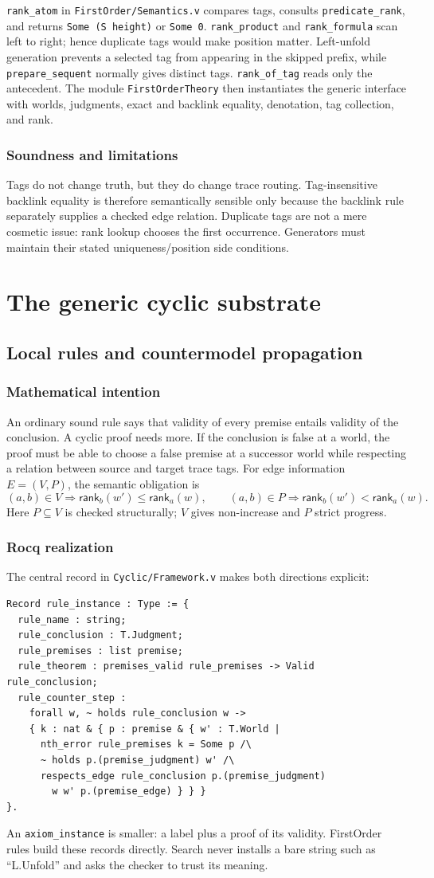 \documentclass[11pt,oneside]{book}
\DeclareRobustCommand{\code}[1]{\nolinkurl{#1}}
\DeclareRobustCommand{\file}[1]{\nolinkurl{#1}}
\newcommand{\src}[2]{\code{#2} in \file{#1}}
\newcommand{\rank}{\mathsf{rank}}
\newcommand{\mathintent}{\subsection*{Mathematical intention}}
\newcommand{\rocqreal}{\subsection*{Rocq realization}}
\newcommand{\soundlim}{\subsection*{Soundness and limitations}}
\begin{document}
\src{FirstOrder/Semantics.v}{rank_atom} compares tags, consults
\code{predicate_rank}, and returns \code{Some (S height)} or \code{Some 0}.
\code{rank_product} and \code{rank_formula} scan left to right; hence duplicate
tags would make position matter.  Left-unfold generation prevents a selected
tag from appearing in the skipped prefix, while \code{prepare_sequent} normally
gives distinct tags.  \code{rank_of_tag} reads only the antecedent.  The module
\code{FirstOrderTheory} then instantiates the generic interface with worlds,
judgments, exact and backlink equality, denotation, tag collection, and rank.

\soundlim

Tags do not change truth, but they do change trace routing.  Tag-insensitive
backlink equality is therefore semantically sensible only because the backlink
rule separately supplies a checked edge relation.  Duplicate tags are not a
mere cosmetic issue: rank lookup chooses the first occurrence.  Generators
must maintain their stated uniqueness/position side conditions.

\chapter{The generic cyclic substrate}
\label{ch:cyclic}

\section{Local rules and countermodel propagation}

\mathintent

An ordinary sound rule says that validity of every premise entails validity of
the conclusion.  A cyclic proof needs more.  If the conclusion is false at a
world, the proof must be able to choose a false premise at a successor world
while respecting a relation between source and target trace tags.  For edge
information \(E=(V,P)\), the semantic obligation is
\[
 (a,b)\in V \Rightarrow \rank_b(w')\le\rank_a(w),\qquad
 (a,b)\in P \Rightarrow \rank_b(w')<\rank_a(w).
\]
Here \(P\subseteq V\) is checked structurally; \(V\) gives non-increase and
\(P\) strict progress.

\rocqreal

The central record in \file{Cyclic/Framework.v} makes both directions explicit:
\begin{lstlisting}[caption={A theorem-backed local cyclic rule.}]
Record rule_instance : Type := {
  rule_name : string;
  rule_conclusion : T.Judgment;
  rule_premises : list premise;
  rule_theorem : premises_valid rule_premises -> Valid rule_conclusion;
  rule_counter_step :
    forall w, ~ holds rule_conclusion w ->
    { k : nat & { p : premise & { w' : T.World |
      nth_error rule_premises k = Some p /\
      ~ holds p.(premise_judgment) w' /\
      respects_edge rule_conclusion p.(premise_judgment)
        w w' p.(premise_edge) } } }
}.
\end{lstlisting}
An \code{axiom_instance} is smaller: a label plus a proof of its validity.
FirstOrder rules build these records directly.  Search never installs a bare
string such as ``L.Unfold'' and asks the checker to trust its meaning.
\end{document}
